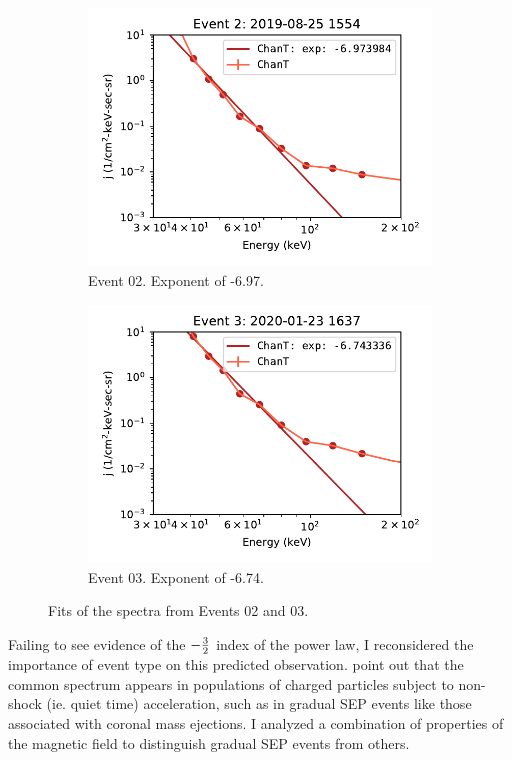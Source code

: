 \documentclass[letterpaper,11pt]{article}
\begin{document}
\begin{figure}[htbp]
\centering
\begin{subfigure}{.45\textwidth}
\centering
\includegraphics[width=1.\linewidth]{figures/spectrum_02.pdf}
\caption{Event 02.  Exponent of -6.97.}
\end{subfigure}
\begin{subfigure}{.45\textwidth}
\centering
\includegraphics[width=1.\linewidth]{figures/spectrum_03.pdf}
\caption{Event 03.  Exponent of -6.74.}
\end{subfigure}
\caption{Fits of the spectra from Events 02 and 03.}
\label{fig:naive_fits}
\end{figure}

Failing to see evidence of the $-{3 \over 2}$ index of the power law, I reconsidered the importance of event type on this predicted observation.  \citet{Fisk2006} point out that the common spectrum appears in populations of charged particles subject to non-shock (ie. quiet time) acceleration, such as in gradual SEP events like those associated with coronal mass ejections.  I analyzed a combination of properties of the magnetic field to distinguish gradual SEP events from others.  
\end{document}
